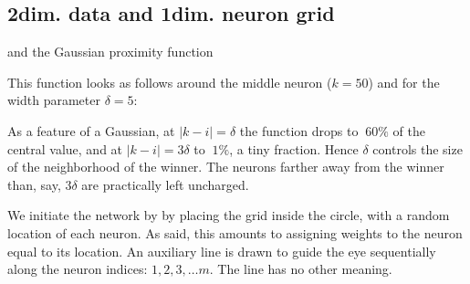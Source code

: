 \documentclass[a4paper,12pt,polish]{jupyterBook}
\begin{document}
\subsection{2\sphinxhyphen{}dim. data and 1\sphinxhyphen{}dim. neuron grid}
\label{\detokenize{docs/som:dim-data-and-1-dim-neuron-grid}}\begin{sphinxVerbatimInput}

\begin{sphinxVerbatim}[commandchars=\\\{\}]
 
\end{sphinxVerbatim}
\end{sphinxVerbatimInput}

\sphinxAtStartPar
and the Gaussian proximity function
\begin{sphinxVerbatimInput}

\begin{sphinxVerbatim}[commandchars=\\\{\}]
                        
      
\end{sphinxVerbatim}
\end{sphinxVerbatimInput}

\sphinxAtStartPar
This function looks as follows around the middle neuron (\(k=50\)) and for the width parameter \(\delta=5\):
\begin{sphinxVerbatimOutput}

\noindent{}
\end{sphinxVerbatimOutput}

\sphinxAtStartPar
As a feature of a Gaussian, at \(|k-i|=\delta\) the function drops to \(~60\%\) of the central value, and at \(|k-i|=3\delta\) to \(~1\%\), a tiny fraction. Hence \(\delta\) controls the size of the neighborhood of the winner. The neurons farther away from the winner than, say, \(3\delta\) are practically left uncharged.

\sphinxAtStartPar
We initiate the network by by placing the grid inside the circle, with a random location of each neuron. As said, this amounts to assigning weights to the neuron equal to its location. An auxiliary line is drawn to guide the eye sequentially along the neuron indices: \(1,2,3,\dots m\). The line has no other meaning.
\end{document}
